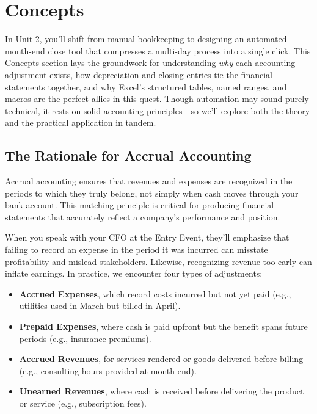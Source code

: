\section{Concepts}
\label{sec:unit2_concepts}

In Unit 2, you’ll shift from manual bookkeeping to designing an automated month-end close tool that compresses a multi-day process into a single click. This Concepts section lays the groundwork for understanding \emph{why} each accounting adjustment exists, how depreciation and closing entries tie the financial statements together, and why Excel’s structured tables, named ranges, and macros are the perfect allies in this quest. Though automation may sound purely technical, it rests on solid accounting principles—so we’ll explore both the theory and the practical application in tandem.

\subsection{The Rationale for Accrual Accounting}
Accrual accounting ensures that revenues and expenses are recognized in the periods to which they truly belong, not simply when cash moves through your bank account. This matching principle is critical for producing financial statements that accurately reflect a company’s performance and position.

When you speak with your CFO at the Entry Event, they’ll emphasize that failing to record an expense in the period it was incurred can misstate profitability and mislead stakeholders. Likewise, recognizing revenue too early can inflate earnings. In practice, we encounter four types of adjustments:
\begin{itemize}
  \item \textbf{Accrued Expenses}, which record costs incurred but not yet paid (e.g., utilities used in March but billed in April).
  \item \textbf{Prepaid Expenses}, where cash is paid upfront but the benefit spans future periods (e.g., insurance premiums).
  \item \textbf{Accrued Revenues}, for services rendered or goods delivered before billing (e.g., consulting hours provided at month-end).
  \item \textbf{Unearned Revenues}, where cash is received before delivering the product or service (e.g., subscription fees).
\end{itemize}

